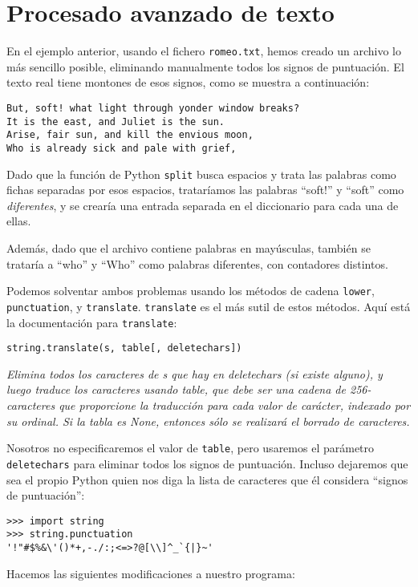 \section{Procesado avanzado de texto}

En el ejemplo anterior, usando el fichero {\tt romeo.txt},
hemos creado un archivo lo más sencillo posible, eliminando
manualmente todos los signos de puntuación. El texto real
tiene montones de esos signos, como se muestra a continuación:

\beforeverb
\begin{verbatim}
But, soft! what light through yonder window breaks?
It is the east, and Juliet is the sun.
Arise, fair sun, and kill the envious moon,
Who is already sick and pale with grief,
\end{verbatim}
\afterverb
%
Dado que la función de Python {\tt split} busca espacios y
trata las palabras como fichas separadas por esos espacios, trataríamos
las palabras ``soft!'' y ``soft'' como \emph{diferentes}, y se crearía
una entrada separada en el diccionario para cada una de ellas.

Además, dado que el archivo contiene palabras en mayúsculas, también se
trataría a ``who'' y ``Who'' como palabras diferentes, con contadores
distintos.

Podemos solventar ambos problemas usando los métodos
de cadena {\tt lower}, {\tt punctuation}, y {\tt translate}.
{\tt translate} es el más sutil de estos métodos.
Aquí está la documentación para {\tt translate}:

\verb"string.translate(s, table[, deletechars])"

\emph{Elimina todos los caracteres de s que hay en deletechars (si existe alguno),
y luego traduce los caracteres usando table, que debe ser una cadena
de 256-caracteres que proporcione la traducción para cada
valor de carácter, indexado por su ordinal. Si la tabla es None,
entonces sólo se realizará el borrado de caracteres.}

Nosotros no especificaremos el valor de {\tt table}, pero usaremos
el parámetro {\tt deletechars} para eliminar todos los signos de puntuación.
Incluso dejaremos que sea el propio Python quien nos diga la lista de caracteres
que él considera ``signos de puntuación'':

\beforeverb
\begin{verbatim}
>>> import string
>>> string.punctuation
'!"#$%&\'()*+,-./:;<=>?@[\\]^_`{|}~'
\end{verbatim}
\afterverb
%
Hacemos las siguientes modificaciones a nuestro programa:

